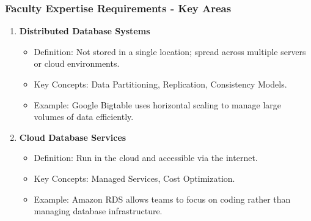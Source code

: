 \documentclass[aspectratio=169]{beamer}
\begin{document}
\begin{frame}[fragile]
    \frametitle{Faculty Expertise Requirements - Key Areas}
    \begin{enumerate}
        \item \textbf{Distributed Database Systems}
        \begin{itemize}
            \item Definition: Not stored in a single location; spread across multiple servers or cloud environments.
            \item Key Concepts: Data Partitioning, Replication, Consistency Models.
            \item Example: Google Bigtable uses horizontal scaling to manage large volumes of data efficiently.
        \end{itemize}
        
        \item \textbf{Cloud Database Services}
        \begin{itemize}
            \item Definition: Run in the cloud and accessible via the internet.
            \item Key Concepts: Managed Services, Cost Optimization.
            \item Example: Amazon RDS allows teams to focus on coding rather than managing database infrastructure.
        \end{itemize}
    \end{enumerate}
\end{frame}
\end{document}
